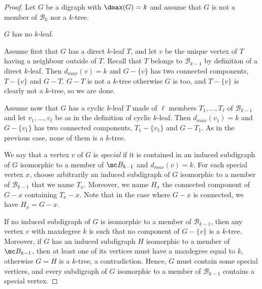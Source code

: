 \begin{proof}
Let $G$ be a digraph with $\dmax(G) = k$ and assume that $G$ is not a member of $\mathcal B_k$ nor a $k$-tree. 

\begin{claim}\label{clm:no_leaf}
$G$ has no $k$-leaf.
\end{claim}

\begin{proofclaim}
Assume first that $G$ has a direct $k$-leaf $T$, and let $v$ be the unique vertex of $T$ having a neighbour outside of $T$. Recall that $T$ belongs to $\mathcal B_{k-1}$ by definition of a direct $k$-leaf. 
Then $d_{max}(v) = k$ and $G-\{v\}$  has two connected components, $T-\{v\}$ and $G -T$. $G-T$ is not a $k$-tree otherwise $G$ is too, and $T-\{v\}$ is clearly not a $k$-tree, so we are done. 

Assume now that $G$ has a cyclic $k$-leaf $T$ made of $\ell$ members $T_1, \dots, T_{\ell}$ of $\mathcal B_{k-1}$ and let $v_1, \dots, v_{\ell}$ be as in the definition of cyclic $k$-leaf. Then $d_{max}(v_1) = k$ and $G - \{v_1\}$ has two connected components, $T_1-\{v_1\}$ and $G-T_1$. As in the previous case, none of them is a $k$-tree. 
\end{proofclaim}

We say that a vertex $v$ of $G$ is \textit{special} if it is contained in an induced subdigraph  of $G$ isomorphic to a member of $\mc B_{k-1}$ and $d_{max}(v) = k$. 
For each special vertex $x$, choose arbitrarily an induced subdigraph of $G$ isomorphic to a member of $\mathcal B_{k-1}$ that we name $T_x$. Moreover, we name $H_x$ the connected component of $G-x$ containing $T_x - x$. Note that in the case where $G- x$ is connected, we have $H_{x} = G- x$. 

If no induced subdigraph of $G$ is isomorphic to a member of $\mathcal B_{k-1}$, then any vertex $v$ with maxdegree $k$ is such that no component of $G - \{v\}$ is a $k$-tree. 
Moreover, if $G$ has an induced subdigraph $H$ isomorphic to a member of $\mc B_{k-1}$, then at least one of its vertices must have a maxdegree equal to $k$, otherwise $G = H$ is a $k$-tree, a contradiction. 
Hence, $G$ must contain some special vertices, and every subdigraph of $G$ isomorphic to a member of $\mathcal B_{k-1}$ contains a special vertex. 
\medskip


\end{proof}
